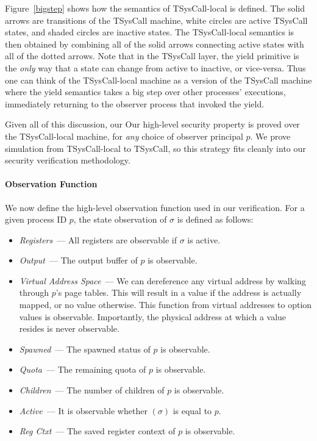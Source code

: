 Figure~\ref{bigstep} shows how
the semantics of
TSysCall-local is defined. The solid arrows are transitions of
the TSysCall machine, white circles are active TSysCall states, 
and shaded circles are inactive states. The TSysCall-local 
semantics is then obtained by 
combining all of the solid arrows connecting active states
with all of the dotted arrows. Note that in the TSysCall
layer, the yield primitive is the \emph{only} way that
a state can change from active to inactive, or vice-versa.
Thus one can think of the TSysCall-local machine as a
version of the TSysCall machine where the yield semantics
takes a big step over other processes' executions, immediately 
returning to the observer process that invoked the yield.

\ifextended
Given all of this discussion, our
\else Our \fi high-level security
property is proved over the TSys\-Call-local machine, for
\emph{any} choice of observer principal $p$. 
We prove simulation from TSysCall-local to 
TSysCall, so this strategy fits cleanly into our
security verification methodology.

\paragraph{Observation Function}

We now define the high-level observation function used
in our verification. 
For a given process ID $p$, the state observation
of $\sigma$ is defined as follows:
\begin{itemize} \itemsep 0pt
\item \emph{Registers}~--- All registers are observable
if $\sigma$ is active. 
\item \emph{Output}~--- The output buffer of $p$ is
observable.
\item \emph{Virtual Address Space}~--- We can dereference 
any virtual address by walking through $p$'s page tables.
This will result in a value if the address is actually
mapped, or no value otherwise. This function from virtual
addresses to option values is observable. Importantly,
the physical address at which a value resides is never
observable.
\item \emph{Spawned}~--- The spawned status of $p$ is observable.
\item \emph{Quota}~--- The remaining quota 
of $p$ is observable.
\item \emph{Children}~--- The number of children
of $p$ is observable.
\item \emph{Active}~--- It is observable whether 
$(\sigma)$ is equal to $p$.
\item \emph{Reg Ctxt}~--- The saved register
context of $p$ is observable.
\end{itemize}

